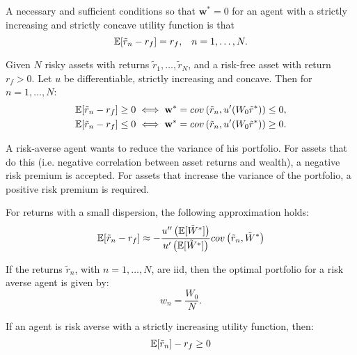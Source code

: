 \documentclass[twoside]{article}
\begin{document}
\begin{proposition}
 A necessary and sufficient conditions so that $\mathbf{w}^* = 0$ for an agent with a strictly increasing and strictly concave utility function is that
\[
    \mathbb{E}[\tilde{r}_n - r_f]  = r_f, \;\;\; n = 1, \dots, N.
\]
\begin{explanation}
\end{explanation}
\end{proposition}

\begin{proposition}
    Given $N$ risky assets with returns $\tilde{r}_1, \dots, \tilde{r}_N$, and a risk-free asset with return $r_f > 0$. Let $u$ be differentiable, strictly increasing and concave. Then for $n = 1, \dots, N$:
    \begin{align*}
        \mathbb{E}[\tilde{r}_n - r_f] &\geq 0 \iff \mathbf{w}^* = cov\left(\tilde{r}_n, u'(W_0\tilde{r}^*)\right) \leq 0, \\
        \mathbb{E}[\tilde{r}_n - r_f] &\leq 0 \iff \mathbf{w}^* = cov\left(\tilde{r}_n, u'(W_0\tilde{r}^*)\right) \geq 0.
    \end{align*}
    \begin{explanation}
        A risk-averse agent wants to reduce the variance of his portfolio. For assets that do this (i.e. negative correlation between asset returns and wealth), a negative risk premium is accepted. For assets that increase the variance of the portfolio, a positive risk premium is required.
    \end{explanation}
\end{proposition}

For returns with a small dispersion, the following approximation holds:
\[
    \mathbb{E}[\tilde{r}_n - r_f] \approx - \frac{u''\left(\mathbb{E}[\tilde{W}^*]\right)}{u'\left(\mathbb{E}[\tilde{W}^*]\right)} cov\left(\tilde{r}_n, \tilde{W}^*\right)
\]


\begin{proposition}
    If the returns $\tilde{r}_n$, with $n = 1, \dots, N$, are iid, then the optimal portfolio for a risk averse agent is given by:
    \[
        w_n = \frac{W_0}{N}.
    \]
\end{proposition}

\begin{proposition}
    If an agent is risk averse with a strictly increasing utility function, then:
    \[
        \mathbb{E}[\tilde{r}_n] - r_f \geq 0
    \]
\end{proposition}
\end{document}
